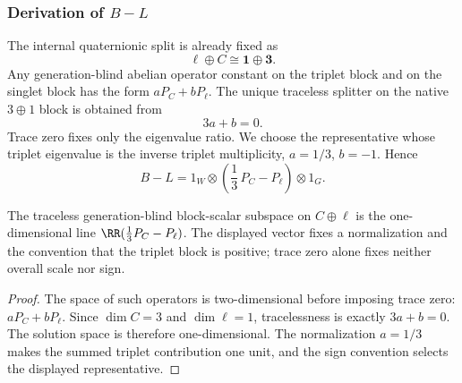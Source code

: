 \documentclass[12pt,a4paper]{article}
\begin{document}
\subsubsection{Derivation of \texorpdfstring{$B-L$}{B-L}}
\label{p5:sec:part1-BminusL}

The internal quaternionic split is already fixed as
\[
\ell\oplus C\cong \mathbf 1\oplus\mathbf 3.
\]
Any generation-blind abelian operator constant on the triplet block and on the singlet block has the form
\(
aP_C+bP_\ell
\).
The unique traceless splitter on the native \(3\oplus1\) block is obtained from
\[
3a+b=0.
\]
Trace zero fixes only the eigenvalue ratio.  We choose the representative
whose triplet eigenvalue is the inverse triplet multiplicity,
\(a=1/3\), \(b=-1\).  Hence
\begin{equation}
\label{p5:eq:part1-BminusL}
B-L=1_W\otimes\left(\frac13\,P_C-P_\ell\right)\otimes 1_G.
\end{equation}

\begin{lemma}
\label{p5:lem:part1-BminusL-unique}
The traceless generation-blind block-scalar subspace on \(C\oplus\ell\) is
the one-dimensional line
\(\RR(\frac13P_C-P_\ell)\).  The displayed vector fixes a normalization and
the convention that the triplet block is positive; trace zero alone fixes
neither overall scale nor sign.
\end{lemma}

\begin{proof}
The space of such operators is two-dimensional before imposing trace zero:
\(aP_C+bP_\ell\).  Since \(\dim C=3\) and \(\dim\ell=1\), tracelessness is exactly
\(3a+b=0\).  The solution space is therefore one-dimensional.  The
normalization \(a=1/3\) makes the summed triplet contribution one unit, and
the sign convention selects the displayed representative.
\end{proof}
\end{document}
